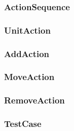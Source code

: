 \subsubsection{ActionSequence}

\subsubsection{UnitAction}

\subsubsection{AddAction}

\subsubsection{MoveAction}

\subsubsection{RemoveAction}

\subsubsection{TestCase}
